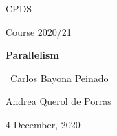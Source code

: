 \makeatletter

\begin{titlepage}
\thispagestyle{empty}
\begin{center}
	\centering
	\vspace{1cm}
	{\scshape\Large CPDS \par}
	\vspace{0.75cm}
	{\Large Course 2020/21 \par}
	\vspace{0.75cm} 
	{\huge\bfseries Parallelism \par}
	\vspace{1cm}
	{\Large\ Carlos Bayona Peinado \par Andrea Querol de Porras\par}
	\vspace{1cm}
    \vspace{0.5cm}
    

 \vfill
	{\large 4 December, 2020\par}
\end{center}


\clearpage
\end{titlepage}

